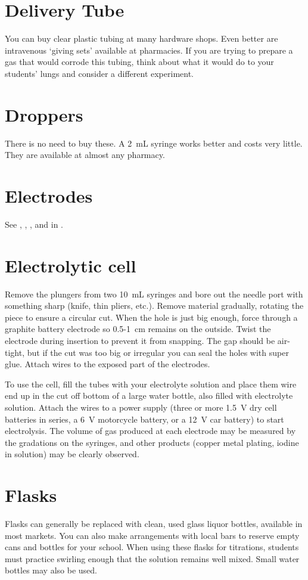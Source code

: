 \section{Delivery Tube}
You can buy clear plastic tubing at many hardware shops. 
Even better are intravenous `giving sets' available at pharmacies. 
If you are trying to prepare a gas that would corrode this tubing, 
think about what it would do to your students' lungs 
and consider a different experiment.

\section{Droppers}
There is no need to buy these. 
A 2~mL syringe works better and costs very little. 
They are available at almost any pharmacy.

\section{Electrodes}
See , 
, 
, 
and  in .

\section{Electrolytic cell}
Remove the plungers from two 10~mL syringes 
and bore out the needle port with something sharp (knife, 
thin pliers, 
etc.). 
Remove material gradually, 
rotating the piece to ensure a circular cut. 
When the hole is just big enough, 
force through a graphite battery electrode 
so 0.5-1~cm remains on the outside. 
Twist the electrode during insertion to prevent it from snapping. 
The gap should be air-tight, 
but if the cut was too big or irregular 
you can seal the holes with super glue. 
Attach wires to the exposed part of the electrodes.

To use the cell, 
fill the tubes with your electrolyte solution 
and place them wire end up in the cut off bottom of a large water bottle, 
also filled with electrolyte solution. 
Attach the wires to a power supply 
(three or more 1.5~V dry cell batteries in series, 
a 6~V motorcycle battery, 
or a 12~V car battery) to start electrolysis. 
The volume of gas produced at each electrode 
may be measured by the gradations on the syringes, 
and other products (copper metal plating, 
iodine in solution) may be clearly observed.

\section{Flasks}
Flasks can generally be replaced with clean, 
used glass liquor bottles, 
available in most markets. 
You can also make arrangements with local bars 
to reserve empty cans and bottles for your school. 
When using these flasks for titrations, 
students must practice swirling enough that the solution remains well mixed. 
Small water bottles may also be used.

